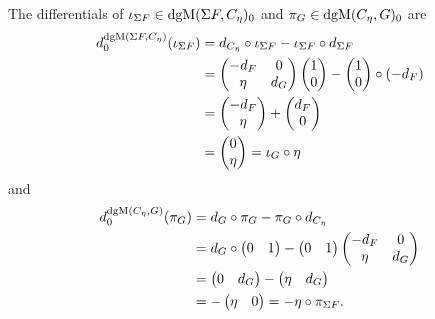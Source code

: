 \begin{remark}
    The differentials of \( \iota_{\Sigma F} \in \operatorname{dgM}(\Sigma F, C_{\eta})_0 \) and \( \pi_G \in \operatorname{dgM}(C_{\eta}, G)_0 \) are
    \begin{align*}
        d_0^{\operatorname{dgM}(\Sigma F, C_{\eta})}(\iota_{\Sigma F}) &= d_{C_{\eta}} \circ \iota_{\Sigma F} - \iota_{\Sigma F} \circ d_{\Sigma F} \\
        &=
        \begin{pmatrix}
            -d_F & 0 \\
            \eta & d_G
        \end{pmatrix}
        \begin{pmatrix}
            1 \\
            0
        \end{pmatrix}
        -
        \begin{pmatrix}
            1 \\
            0
        \end{pmatrix}
        \circ (- d_F) \\
        &=
        \begin{pmatrix}
            -d_F \\
            \eta
        \end{pmatrix}
        +
        \begin{pmatrix}
            d_F \\
            0
        \end{pmatrix} \\
        &=
        \begin{pmatrix}
            0 \\
            \eta
        \end{pmatrix}
        = \iota_G \circ \eta
    \end{align*}
    and
    \begin{align*}
        d_0^{\operatorname{dgM}(C_{\eta}, G)}(\pi_G) &= d_G \circ \pi_G - \pi_G \circ d_{C_{\eta}} \\
        &= d_G \circ
        \begin{pmatrix}
            0 & 1
        \end{pmatrix}
        -
        \begin{pmatrix}
            0 & 1
        \end{pmatrix}
        \begin{pmatrix}
            -d_F & 0 \\
            \eta & d_G
        \end{pmatrix} \\
        &=
        \begin{pmatrix}
            0 & d_G
        \end{pmatrix}
        -
        \begin{pmatrix}
            \eta & d_G
        \end{pmatrix} \\
        &= -
        \begin{pmatrix}
            \eta & 0
        \end{pmatrix}
        = - \eta \circ \pi_{\Sigma F}.
    \end{align*}
\end{remark}


